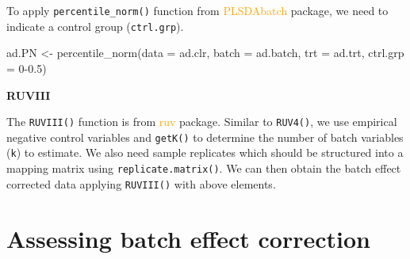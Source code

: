 \documentclass[
]{book}
\newenvironment{Shaded}{\begin{snugshade}}{\end{snugshade}}
\newcommand{\AttributeTok}[1]{\textcolor[rgb]{0.77,0.63,0.00}{#1}}
\newcommand{\FunctionTok}[1]{\textcolor[rgb]{0.00,0.00,0.00}{#1}}
\newcommand{\NormalTok}[1]{#1}
\newcommand{\OtherTok}[1]{\textcolor[rgb]{0.56,0.35,0.01}{#1}}
\newcommand{\SpecialCharTok}[1]{\textcolor[rgb]{0.00,0.00,0.00}{#1}}
\newcommand{\StringTok}[1]{\textcolor[rgb]{0.31,0.60,0.02}{#1}}
\begin{document}
To apply \texttt{percentile\_norm()} function from \textcolor{orange}{PLSDAbatch} package, we need to indicate a control group (\texttt{ctrl.grp}).

\begin{Shaded}
\begin{Highlighting}[]
\NormalTok{ad.PN }\OtherTok{\textless{}{-}} \FunctionTok{percentile\_norm}\NormalTok{(}\AttributeTok{data =}\NormalTok{ ad.clr, }\AttributeTok{batch =}\NormalTok{ ad.batch, }
                         \AttributeTok{trt =}\NormalTok{ ad.trt, }\AttributeTok{ctrl.grp =} \StringTok{\textquotesingle{}0{-}0.5\textquotesingle{}}\NormalTok{)}
\end{Highlighting}
\end{Shaded}

\textbf{RUVIII}

The \texttt{RUVIII()} function is from \textcolor{orange}{ruv} package. Similar to \texttt{RUV4()}, we use empirical negative control variables and \texttt{getK()} to determine the number of batch variables (\texttt{k}) to estimate. We also need sample replicates which should be structured into a mapping matrix using \texttt{replicate.matrix()}. We can then obtain the batch effect corrected data applying \texttt{RUVIII()} with above elements.

\begin{Shaded}
\end{Shaded}

\hypertarget{assessing-batch-effect-correction}{%
\section{Assessing batch effect correction}\label{assessing-batch-effect-correction}}
\end{document}

